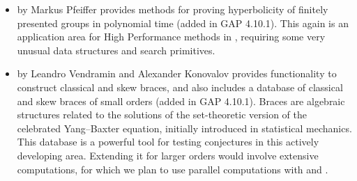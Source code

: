 \begin{itemize}
\item
{} by Markus Pfeiffer \cite{walrus} provides methods for proving 
hyperbolicity of finitely presented groups in polynomial time
(added in GAP 4.10.1). This again is an application area for High
Performance methods in \GAP, requiring some very unusual data
structures and search primitives.

\item
{} by Leandro Vendramin and Alexander Konovalov \cite{YangBaxter}
provides functionality to construct classical and 
skew braces, and also includes a database of classical 
and skew braces of small orders (added in GAP 4.10.1). 
Braces are algebraic structures related to the solutions
of the set-theoretic version of the celebrated Yang--Baxter equation,
initially introduced in statistical mechanics.
This database is a powerful tool for testing conjectures
in this actively developing area. Extending it for larger
orders would involve extensive computations, for which we 
plan to use parallel computations with  and \HPCGAP.

\end{itemize}
